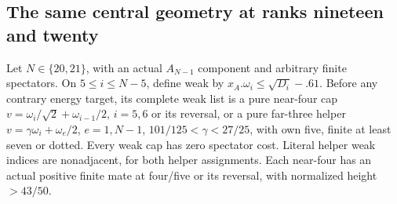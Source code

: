 \subsection{The same central geometry at ranks nineteen and twenty}
\label{app:tail:A19A20}
\begin{lemma}[The actual $N=20,21$ central geometry]
\label{app:tail:lem:Awindow2021}
Let $N\in\{20,21\}$, with an actual $A_{N-1}$ component and
arbitrary finite spectators. On $5\le i\le N-5$, define weak by
$x_A.\omega_i\le\sqrt{D_i}-.61$. Before any contrary energy target,
its complete weak list is a pure near-four cap
$v=\omega_i/\sqrt2+\omega_{i-1}/2$, $i=5,6$ or its reversal,
or a pure far-three helper
$v=\gamma\omega_i+\omega_e/2$, $e=1,N-1$,
$101/125<\gamma<27/25$, with own five, finite at least seven or
dotted. Every weak cap has zero spectator cost. Literal helper
weak indices are nonadjacent, for both helper assignments.
Each near-four has an actual positive finite mate at four/five or
its reversal, with normalized height $>43/50$.
\end{lemma}
